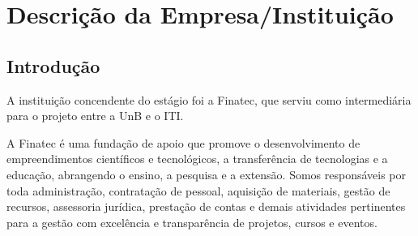 \chapter[Descrição da Empresa/Instituição]{Descrição da Empresa/Instituição}


\section{Introdução}

A instituição concendente do estágio foi a Finatec, que serviu como intermediária para o projeto entre a UnB e o ITI.

A Finatec é uma fundação de apoio que promove o desenvolvimento de empreendimentos científicos e tecnológicos,
a transferência de tecnologias e a educação, abrangendo o ensino, a pesquisa e a extensão. Somos responsáveis por toda administração,
contratação de pessoal, aquisição de materiais, gestão de recursos, assessoria jurídica, prestação de
contas e demais atividades pertinentes para a gestão com excelência e transparência de projetos, cursos e eventos.

